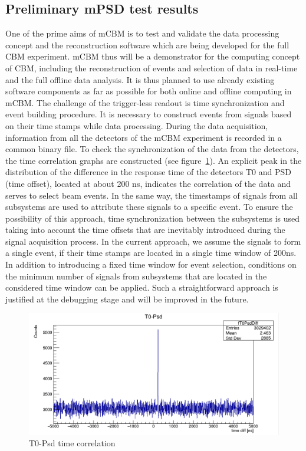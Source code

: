 \documentclass[a4paper,11pt]{article}
\begin{document}
\subsection{Preliminary mPSD test results}
One of the prime aims of mCBM is to test and validate the data processing concept and the reconstruction software which are being developed for the full CBM experiment. mCBM thus will be a demonstrator for the computing concept of CBM, including the reconstruction of events and selection of data in real-time and the full offline data analysis. It is thus planned to use already existing software components as far as possible for both online and offline computing in mCBM.
The challenge of the trigger-less readout is time synchronization and event building procedure. It is necessary to construct events from signals based on their time stamps while data processing.
During the data acquisition, information from all the detectors of the mCBM experiment is recorded in a common binary file. To check the synchronization of the data from the detectors, the time correlation graphs are constructed (see figure~\ref{fig:6}). An explicit peak in the distribution of the difference in the response time of the detectors T0 and PSD (time offset), located at about 200 ns, indicates the correlation of the data and serves to select beam events.
In the same way, the timestamps of signals from all subsystems are used to attribute these signals to a specific event. To ensure the possibility of this approach, time synchronization between the subsystems is used taking into account the time offsets that are inevitably introduced during the signal acquisition process. In the current approach, we assume the signals to form a single event, if their time stamps are located in a single time window of 200ns. In addition to introducing a fixed time window for event selection, conditions on the minimum number of signals from subsystems that are located in the considered time window can be applied. Such a straightforward approach is justified at the debugging stage and will be improved in the future.

\begin{figure}[htbp]
\centering %
\includegraphics[width=\textwidth]{run582T0Psd.png}

\caption{\label{fig:6} T0-Psd time correlation}
\end{figure}
\end{document}
